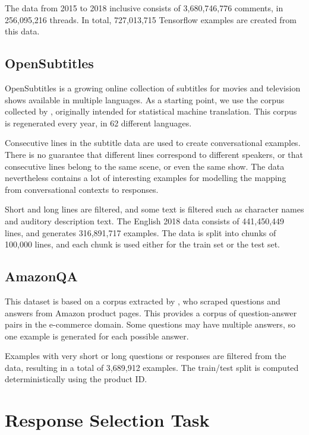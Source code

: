 \documentclass[11pt,a4paper,table]{article}
\begin{document}
The data from 2015 to 2018 inclusive consists of 3,680,746,776 comments, in 256,095,216 threads. In total, 727,013,715 Tensorflow examples are created from this data.

\subsection{OpenSubtitles}

OpenSubtitles is a growing online collection of subtitles for movies and television shows available in multiple languages.
As a starting point, we use the corpus collected by , originally intended for statistical machine translation. This corpus is regenerated every year, in 62 different languages.

Consecutive lines in the subtitle data are used to create conversational examples. There is no guarantee that different lines correspond to different speakers, or that consecutive lines belong to the same scene, or even the same show. The data nevertheless contains a lot of interesting examples for modelling the mapping from conversational contexts to responses.

Short and long lines are filtered, and some text is filtered such as character names and auditory description text.  The English 2018 data consists of 441,450,449 lines, and generates 316,891,717 examples. The data is split into chunks of 100,000 lines, and each chunk is used either for the train set or the test set.

\subsection{AmazonQA}

This dataset is based on a corpus extracted by , who scraped questions and answers from Amazon product pages. This provides a corpus of question-answer pairs in the e-commerce domain. Some questions may have multiple answers, so one example is generated for each possible answer.

Examples with very short or long questions or responses are filtered from the data, resulting in a total of 3,689,912 examples. The train/test split is computed deterministically using the product ID.

\section{Response Selection Task} \label{sec:methods}
\end{document}
